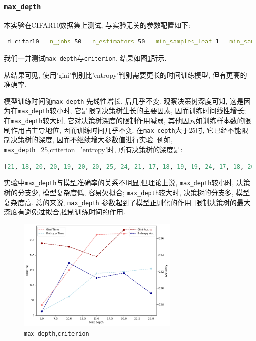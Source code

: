 \documentclass[a4paper]{article}
\begin{document}
\subsubsection{\texttt{max\_depth}}

本实验在CIFAR10数据集上测试, 与实验无关的参数配置如下:

 \begin{lstlisting}[language=bash]
-d cifar10 --n_jobs 50 --n_estimators 50 --min_samples_leaf 1 --min_samples_split 2 
\end{lstlisting}

我们一并测试\texttt{max\_depth}与\texttt{criterion}, 结果如图\ref{fig:max_depth}所示. 

从结果可见, 使用'gini'判别比'entropy'判别需要更长的时间训练模型, 但有更高的准确率. 

模型训练时间随\texttt{max\_depth} 先线性增长, 后几乎不变. 观察决策树深度可知, 这是因为在\texttt{max\_depth}较小时, 它是限制决策树生长的主要因素, 因而训练时间线性增长; 在\texttt{max\_depth}较大时, 它对决策树深度的限制作用减弱, 其他因素如训练样本数的限制作用占主导地位, 因而训练时间几乎不变. 在\texttt{max\_depth}大于25时, 它已经不能限制决策树的深度, 因而不继续增大参数值进行实验.
例如, \texttt{max\_depth}=25,criterion='entropy'时, 所有决策树的深度是: \begin{lstlisting}[language=python]
[21, 18, 20, 20, 19, 20, 20, 25, 24, 21, 17, 18, 19, 19, 24, 17, 18, 20, 17, 21, 19, 25, 21, 21, 21, 20, 19, 24, 24, 19, 18, 19, 18, 21, 21, 20, 19, 20, 21, 19, 18, 18, 18, 18, 17, 18, 17, 18, 19, 21]
\end{lstlisting}

实验中\texttt{max\_depth}与模型准确率的关系不明显,但理论上说, \texttt{max\_depth}较小时, 决策树的分支少, 模型复杂度低, 容易欠拟合; \texttt{max\_depth}较大时, 决策树的分支多, 模型复杂度高. 总的来说, \texttt{max\_depth} 参数起到了模型正则化的作用, 限制决策树的最大深度有避免过拟合,控制训练时间的作用. 

\begin{figure}[h]
    \centering
    \includegraphics[width=0.7\textwidth,height=0.4\textwidth]{figs/2.png}
    
    \caption{\texttt{max\_depth},\texttt{criterion}}
    \label{fig:max_depth}
\end{figure}
\end{document}
